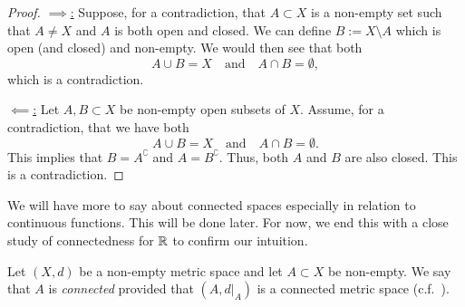 \begin{proof}
	\ul{$\implies$:} Suppose, for a contradiction, that $A\subset X$ is a non-empty set such that $A\neq X$ and $A$ is both open and closed. We can define $B:= X\setminus A$ which is open (and closed) and non-empty. We would then see that both
	\[
	A \cup B = X\quad\text{and}\quad A\cap B = \emptyset,
	\]
	which is a contradiction.
	
	\ul{$\impliedby$:} Let $A,B\subset X$ be non-empty open subsets of $X$. Assume, for a contradiction, that we have both
	\[
	A\cup B = X\quad\text{and}\quad A\cap B = \emptyset.
	\]
	This implies that $B = A^\complement$ and $A = B^\complement$. Thus, both $A$ and $B$ are also closed. This is a contradiction.
\end{proof}
We will have more to say about connected spaces especially in relation to continuous functions. This will be done later. For now, we end this with a close study of connectedness for $\mathbb{R}$ to confirm our intuition. 
\begin{defn}
	\label{defn:connect_sub}
	Let $(X,d)$ be a non-empty metric space and let $A\subset X$ be non-empty. We say that $A$ is \textit{connected} provided that $(A,d|_A)$ is a connected metric space (c.f.~).
\end{defn}
